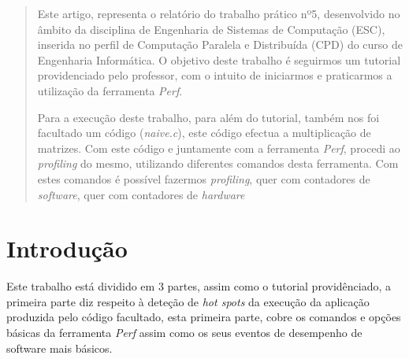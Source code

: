 \documentclass[conference,compsoc]{IEEEtran}
\begin{document}
\maketitle
\tableofcontents
\vspace{0.5cm}
\begin{abstract}
Este artigo, representa o relatório do trabalho prático nº5, desenvolvido no âmbito da disciplina de Engenharia de Sistemas de Computação (ESC), inserida no perfil de Computação Paralela e Distribuída (CPD) do curso de Engenharia Informática. O objetivo deste trabalho é seguirmos um tutorial\cite{tutorial} providenciado pelo professor, com o intuito de iniciarmos e praticarmos a utilização da ferramenta \textit{Perf}. 

Para a execução deste trabalho, para além do tutorial, também nos foi facultado um código (\textit{naive.c}), este código efectua a multiplicação de matrizes. Com este código e juntamente com a ferramenta \textit{Perf}, procedi ao \textit{profiling} do mesmo, utilizando diferentes comandos desta ferramenta. Com estes comandos é possível fazermos \textit{profiling}, quer com contadores de \textit{software}, quer com contadores de \textit{hardware} 

\end{abstract}





%
\IEEEpeerreviewmaketitle



\section{Introdução}

Este trabalho está dividido em 3 partes, assim como o tutorial providênciado, a primeira parte diz respeito à deteção de \textit{hot spots} da execução da aplicação produzida pelo código facultado, esta primeira parte, cobre os comandos e opções básicas da ferramenta \textit{Perf} assim como os seus eventos de desempenho de software mais básicos. 
\end{document}
